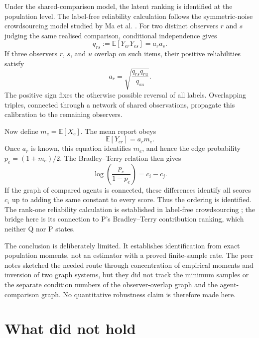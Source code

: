 \documentclass{article}
\begin{document}
Under the shared-comparison model, the latent ranking is identified at the population level.  The label-free reliability calculation follows the symmetric-noise crowdsourcing model studied by Ma et al. \cite{ma2017crowdsourcing}.  For two distinct observers $r$ and $s$ judging the same realised comparison, conditional independence gives
\begin{equation}
q_{rs}:=\mathbb{E}[Y_{er}Y_{es}]=a_ra_s.
\end{equation}
If three observers $r$, $s$, and $u$ overlap on such items, their positive reliabilities satisfy
\begin{equation}
a_r=\sqrt{\frac{q_{rs}q_{ru}}{q_{su}}}.
\end{equation}
The positive sign fixes the otherwise possible reversal of all labels.  Overlapping triples, connected through a network of shared observations, propagate this calibration to the remaining observers.

Now define $m_e=\mathbb{E}[X_e]$.  The mean report obeys
\begin{equation}
\mathbb{E}[Y_{er}]=a_rm_e.
\end{equation}
Once $a_r$ is known, this equation identifies $m_e$, and hence the edge probability $p_e=(1+m_e)/2$.  The Bradley--Terry relation then gives
\begin{equation}
\log\!\left(\frac{p_e}{1-p_e}\right)=c_i-c_j.
\end{equation}
If the graph of compared agents is connected, these differences identify all scores $c_i$ up to adding the same constant to every score.  Thus the ordering is identified.  The rank-one reliability calculation is established in label-free crowdsourcing \cite{ma2017crowdsourcing}; the bridge here is its connection to P's Bradley--Terry contribution ranking, which neither Q nor P states.

The conclusion is deliberately limited.  It establishes identification from exact population moments, not an estimator with a proved finite-sample rate.  The peer notes sketched the needed route through concentration of empirical moments and inversion of two graph systems, but they did not track the minimum samples or the separate condition numbers of the observer-overlap graph and the agent-comparison graph.  No quantitative robustness claim is therefore made here.

\section{What did not hold}
\end{document}
